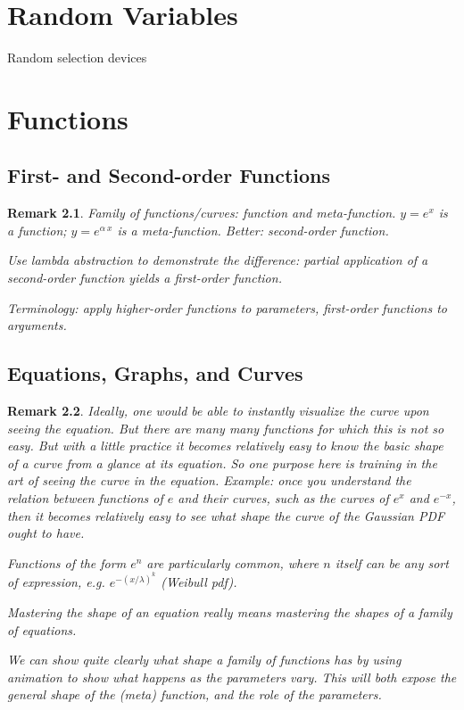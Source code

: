 \documentclass[reqno,12pt]{tufte-book}
\numberwithin{equation}{subsection}
\newtheorem{remark}{Remark}
\begin{document}
\chapter{Random Variables}

Random selection devices

\chapter{Functions}

\section{First- and Second-order Functions}

\begin{remark}
Family of functions/curves: function and meta-function.  $y=e^x$ is a
function; $y=e^{\alpha\ x}$ is a meta-function.  Better: second-order function.

Use lambda abstraction to demonstrate the difference: partial
application of a second-order function yields a first-order function.

Terminology: apply higher-order functions to \textit{parameters},
first-order functions to \textit{arguments}.
\end{remark}

\section{Equations, Graphs, and Curves}

\begin{remark}
  Ideally, one would be able to instantly visualize the curve upon
  seeing the equation.  But there are many many functions for which
  this is not so easy.  But with a little practice it becomes
  relatively easy to know the basic shape of a curve from a glance at
  its equation.  So one purpose here is training in the art of seeing
  the curve in the equation.  Example: once you understand the
  relation between functions of $e$ and their curves, such as the
  curves of $e^x$ and $e^{-x}$, then it becomes relatively easy to see
  what shape the curve of the Gaussian PDF ought to have.

  Functions of the form $e^n$ are particularly common, where $n$
  itself can be any sort of expression, e.g. $e^{-(x/\lambda)^k}$
  (Weibull pdf).

  Mastering the shape of an equation really means mastering the shapes
  of a family of equations.

  We can show quite clearly what shape a family of functions has by
  using animation to show what happens as the parameters vary.  This
  will both expose the general shape of the (meta) function, and the
  role of the parameters.
\end{remark}
\end{document}
